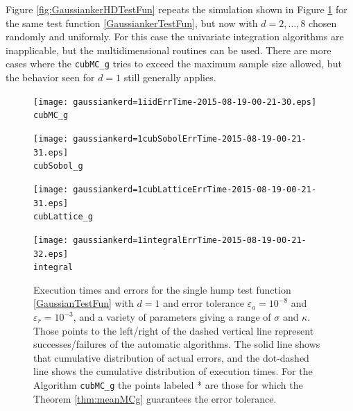 \documentclass{iitthesis}
\begin{document}
Figure \ref{fig:GaussiankerHDTestFun} repeats the simulation shown in Figure \ref{fig:GaussiankerTestFun} for the same test function \eqref{GaussiankerTestFun}, but now with $d=2, \ldots, 8$ chosen randomly and uniformly.  For this case the univariate integration algorithms are inapplicable, but the multidimensional routines can be used.  There are more cases where the  {\tt cubMC\_g}  tries to exceed the maximum sample size allowed, but the behavior seen for $d=1$ still generally applies.  

\begin{figure}
\centering
\begin{minipage}{7cm} \centering \texttt{[image: gaussiankerd=1iidErrTime-2015-08-19-00-21-30.eps]} \\ {\tt cubMC\_g}  \end{minipage}
\begin{minipage}{7cm} \centering \texttt{[image: gaussiankerd=1cubSobolErrTime-2015-08-19-00-21-31.eps]} \\  {\tt cubSobol\_g}\end{minipage}
\begin{minipage}{7cm} \centering \texttt{[image: gaussiankerd=1cubLatticeErrTime-2015-08-19-00-21-31.eps]} \\ {\tt cubLattice\_g} \end{minipage}
\begin{minipage}{7cm} \centering \texttt{[image: gaussiankerd=1integralErrTime-2015-08-19-00-21-32.eps]} \\ {\tt integral } \end{minipage}
\caption{Execution times and errors for the single hump test function \eqref{GaussianTestFun} with $d=1$ and error tolerance $\varepsilon_a=10^{-8}$ and $\varepsilon_r=10^{-3}$, and a variety of parameters giving a range of $\sigma$ and $\kappa$. Those points to the left/right of the dashed vertical line represent successes/failures of the automatic algorithms.  The solid line shows that cumulative distribution of actual errors, and the dot-dashed line shows the cumulative distribution of execution times.  For the Algorithm {\tt cubMC\_g} the points labeled * are those for which the Theorem \ref{thm:meanMCg} guarantees the error tolerance.\label{fig:GaussiankerTestFun} }
\end{figure}
\end{document}
